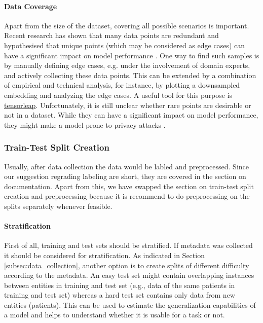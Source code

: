 \paragraph{Data Coverage}
Apart from the size of the dataset, covering all possible scenarios is important. Recent research has shown that many data points are redundant   \citep{Toneva2018_catastrophicForgetting, Sorscher2022_BeyondScalingLaws, Feldman2020_CoreSetsSurvey} and hypothesised that unique points (which may be considered as edge cases) can have a significant impact on model performance  \citep{Feldman2020_LongTail}. One way to find such samples is by manually defining edge cases, e.g. under the involvement of domain experts, and actively collecting these data points. This can be extended by a combination of empirical and technical analysis, for instance, by plotting a downsampled embedding and analyzing the edge cases. A useful tool for this purpose is  \href{https://tensorleap.ai/}{tensorleap}. 
\pagebreak
Unfortunately, it is still unclear whether rare points are desirable or not in a dataset. While they can have a significant impact on model performance, they might make a model prone to privacy attacks \citep{Sorscher2022_BeyondScalingLaws, Feldman2020_LongTail}. 


\subsubsection{Train-Test Split Creation}
Usually, after data collection the data would be labled and preprocessed. Since our suggestion regrading labeling are short, they are covered in the section on documentation. Apart from this, we have swapped the section on train-test split creation and preprocessing because it is recommend to do preprocessing on the splits separately whenever feasible.

\paragraph{Stratification}
\label{app:stratification}
First of all, training and test sets should be stratified.
If metadata was collected it should be considered for stratification. As indicated in Section \ref{subsec:data_collection}, another option is to create splits of different difficulty according to the metadata. An easy test set might contain overlapping instances between entities in training and test set (e.g., data of the same patients in training and test set) whereas a hard test set contains only data from  new entities (patients). This can be used to estimate the generalization capabilities of a model and helps to understand whether it is usable for a task or not. 

